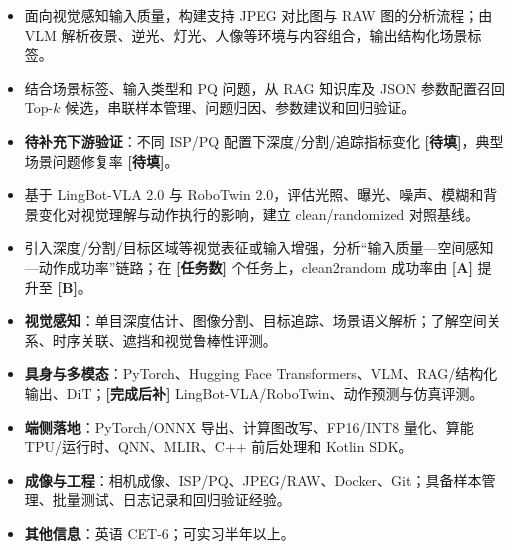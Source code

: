 \begin{itemize}
  \item 面向视觉感知输入质量，构建支持 JPEG 对比图与 RAW 图的分析流程；由 VLM 解析夜景、逆光、灯光、人像等环境与内容组合，输出结构化场景标签。
  \item 结合场景标签、输入类型和 PQ 问题，从 RAG 知识库及 JSON 参数配置召回 Top-$k$ 候选，串联样本管理、问题归因、参数建议和回归验证。
  \item \textbf{待补充下游验证}：不同 ISP/PQ 配置下深度/分割/追踪指标变化 \textbf{[待填]}，典型场景问题修复率 \textbf{[待填]}。
\end{itemize}

\begin{itemize}
  \item 基于 LingBot-VLA 2.0 与 RoboTwin 2.0，评估光照、曝光、噪声、模糊和背景变化对视觉理解与动作执行的影响，建立 clean/randomized 对照基线。
  \item 引入深度/分割/目标区域等视觉表征或输入增强，分析“输入质量—空间感知—动作成功率”链路；在 \textbf{[任务数]} 个任务上，clean2random 成功率由 \textbf{[A]} 提升至 \textbf{[B]}。
\end{itemize}

\begin{itemize}
  \item \textbf{视觉感知}：单目深度估计、图像分割、目标追踪、场景语义解析；了解空间关系、时序关联、遮挡和视觉鲁棒性评测。
  \item \textbf{具身与多模态}：PyTorch、Hugging Face Transformers、VLM、RAG/结构化输出、DiT；\textbf{[完成后补]} LingBot-VLA/RoboTwin、动作预测与仿真评测。
  \item \textbf{端侧落地}：PyTorch/ONNX 导出、计算图改写、FP16/INT8 量化、算能 TPU/运行时、QNN、MLIR、C++ 前后处理和 Kotlin SDK。
  \item \textbf{成像与工程}：相机成像、ISP/PQ、JPEG/RAW、Docker、Git；具备样本管理、批量测试、日志记录和回归验证经验。
  \item \textbf{其他信息}：英语 CET-6；可实习半年以上。
\end{itemize}
